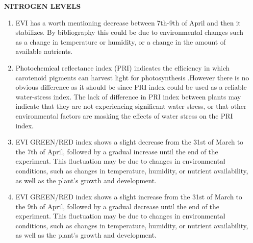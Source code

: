 \documentclass{article}
\begin{document}
                            \vspace*{3\baselineskip}
                            \textbf{NITROGEN LEVELS}\par
                            \vspace*{1\baselineskip}
                            
                            \begin{enumerate}
                                \item  EVI has a worth mentioning decrease between 7th-9th of April and then it stabilizes. By bibliography this could be due to environmental changes such as a change in temperature or humidity, or a change in the amount of available nutrients.\par
                                \vspace*{1\baselineskip}
                                \item Photochemical reflectance index (PRI) indicates the efficiency in which carotenoid pigments can harvest light for photosynthesis .However there is no obvious difference as it should be since PRI index could be used as a reliable water-stress index. The lack of difference in PRI index between plants may indicate that they are not experiencing significant water stress, or that other environmental factors are masking the effects of water stress on the PRI index.\par
                                \vspace*{1\baselineskip}
                                \item  EVI GREEN/RED index shows a slight decrease from the 31st of March to the 7th of April, followed by a gradual increase until the end of the experiment. This fluctuation may be due to changes in environmental conditions, such as changes in temperature, humidity, or nutrient availability, as well as the plant's growth and development.\par
                                \vspace*{1\baselineskip}
                                \item EVI GREEN/RED index shows a slight increase from the 31st of March to the 9th of April, followed by a gradual decrease until the end of the experiment. This fluctuation may be due to changes in environmental conditions, such as changes in temperature, humidity, or nutrient availability, as well as the plant's growth and development.\par
                                \vspace*{1\baselineskip}
                            \end{enumerate}
\end{document}
